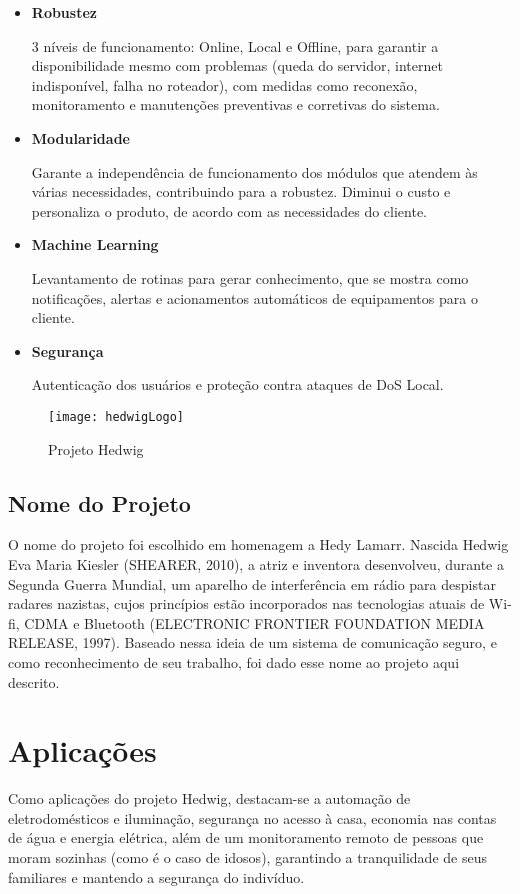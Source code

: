 \begin{itemize}
\item \textbf{Robustez}

3 níveis de funcionamento: Online, Local e Offline, para garantir a disponibilidade mesmo com problemas (queda do servidor, internet indisponível, falha no roteador), com medidas como reconexão, monitoramento e manutenções preventivas e corretivas do sistema.

\item \textbf{Modularidade}

Garante a independência de funcionamento dos módulos que atendem às várias necessidades, contribuindo para a robustez. Diminui o custo e personaliza o produto, de acordo com as necessidades do cliente.

\item \textbf{Machine Learning}

Levantamento de rotinas para gerar conhecimento, que se mostra como notificações, alertas e acionamentos automáticos de equipamentos para o cliente.

\item \textbf{Segurança}

Autenticação dos usuários e proteção contra ataques de DoS Local.
\end{itemize}


\begin{figure}[H]
	\centering
	\caption{Projeto Hedwig}
  \texttt{[image: hedwigLogo]}
\label{fig:hedwigLogo}
\end{figure}

\subsection{Nome do Projeto}
O nome do projeto foi escolhido em homenagem a Hedy Lamarr. Nascida Hedwig Eva Maria Kiesler (SHEARER, 2010), a atriz e inventora desenvolveu, durante a Segunda Guerra Mundial, um aparelho de interferência em rádio para despistar radares nazistas, cujos princípios estão incorporados nas tecnologias atuais de Wi-fi, CDMA e Bluetooth (ELECTRONIC FRONTIER FOUNDATION MEDIA RELEASE, 1997). Baseado nessa ideia de um sistema de comunicação seguro, e como reconhecimento de seu trabalho, foi dado esse nome ao projeto aqui descrito.

\section{Aplicações}
Como aplicações do projeto Hedwig, destacam-se a automação de eletrodomésticos e iluminação, segurança no acesso à casa, economia nas contas de água e energia elétrica, além de um monitoramento  remoto de pessoas que moram sozinhas (como é o caso de idosos), garantindo a tranquilidade de seus familiares e mantendo a segurança do indivíduo.

